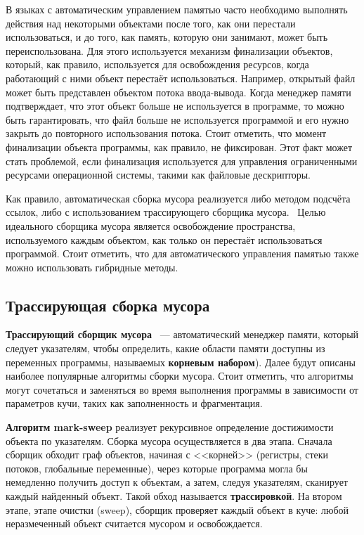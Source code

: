 В языках с автоматическим управлением памятью часто необходимо выполнять действия над некоторыми объектами после того, как они перестали использоваться, и до того, как память, которую они занимают, может быть переиспользована. Для этого используется механизм финализации объектов, который, как правило, используется для освобождения ресурсов, когда работающий с ними объект перестаёт использоваться. Например, открытый файл может быть представлен объектом потока ввода-вывода. Когда менеджер памяти подтверждает, что этот объект больше не используется в программе, то можно быть гарантировать, что файл больше не используется программой и его нужно закрыть до повторного использования потока. Стоит отметить, что момент финализации объекта программы, как правило, не фиксирован. Этот факт может стать проблемой, если финализация используется для управления ограниченными ресурсами операционной системы, такими как файловые дескрипторы.~\cite{glossary}

Как правило, автоматическая сборка мусора реализуется либо методом подсчёта ссылок, либо с использованием трассирующего сборщика мусора.~\cite{recycling} Целью идеального сборщика мусора является освобождение пространства, используемого каждым объектом, как только он перестаёт использоваться программой. Стоит отметить, что для автоматического управления памятью также можно использовать гибридные методы.~\cite{cornell2}~\cite{urc}

\subsection*{Трассирующая сборка мусора}
\label{tracing}

\textbf{Трассирующий сборщик мусора}~\cite{recycling} --- автоматический менеджер памяти, который следует указателям, чтобы определить, какие области памяти доступны из переменных программы, называемых \textbf{корневым набором}). Далее будут описаны наиболее популярные алгоритмы сборки мусора. Стоит отметить, что алгоритмы могут сочетаться и заменяться во время выполнения программы в зависимости от параметров кучи, таких как заполненность и фрагментация.~\cite{handbook}

\textbf{Алгоритм mark-sweep} реализует рекурсивное определение достижимости объекта по указателям. Сборка мусора осуществляется в два этапа. Сначала сборщик обходит граф объектов, начиная с <<корней>> (регистры, стеки потоков, глобальные переменные), через которые программа могла бы немедленно получить доступ к объектам, а затем, следуя указателям, сканирует каждый найденный объект. Такой обход называется \textbf{трассировкой}. На втором этапе, этапе очистки (sweep), сборщик проверяет каждый объект в куче: любой неразмеченный объект считается мусором и освобождается.~\cite{handbook}

